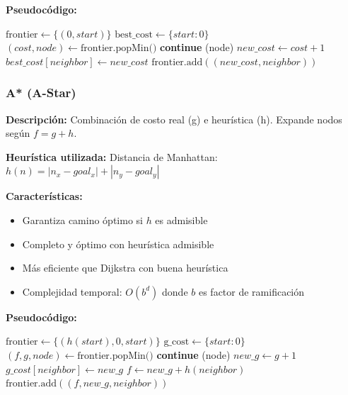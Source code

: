 \documentclass[12pt,a4paper]{article}
\begin{document}
\textbf{Pseudocódigo:}
\begin{algorithm}[H]
\caption{UCS (Dijkstra)}
\begin{algorithmic}
\State $\text{frontier} \gets \{(0, start)\}$
\State $\text{best\_cost} \gets \{start: 0\}$
    \State $(cost, node) \gets \text{frontier.popMin()}$
        \State \textbf{continue}
    \EndIf
        \Return {}(node)
    \EndIf
        \State $new\_cost \gets cost + 1$
            \State $best\_cost[neighbor] \gets new\_cost$
            \State $\text{frontier.add}((new\_cost, neighbor))$
        \EndIf
    \EndFor
\EndWhile
\end{algorithmic}
\end{algorithm}

\subsubsection{A* (A-Star)}

\textbf{Descripción:} Combinación de costo real (g) e heurística (h). Expande nodos según $f = g + h$.

\textbf{Heurística utilizada:} Distancia de Manhattan: $h(n) = |n_x - goal_x| + |n_y - goal_y|$

\textbf{Características:}
\begin{itemize}
    \item Garantiza camino óptimo si $h$ es admisible
    \item Completo y óptimo con heurística admisible
    \item Más eficiente que Dijkstra con buena heurística
    \item Complejidad temporal: $O(b^d)$ donde $b$ es factor de ramificación
\end{itemize}

\textbf{Pseudocódigo:}
\begin{algorithm}[H]
\caption{A* Search}
\begin{algorithmic}
\State $\text{frontier} \gets \{(h(start), 0, start)\}$
\State $\text{g\_cost} \gets \{start: 0\}$
    \State $(f, g, node) \gets \text{frontier.popMin()}$
        \State \textbf{continue}
    \EndIf
        \Return {}(node)
    \EndIf
        \State $new\_g \gets g + 1$
            \State $g\_cost[neighbor] \gets new\_g$
            \State $f \gets new\_g + h(neighbor)$
            \State $\text{frontier.add}((f, new\_g, neighbor))$
        \EndIf
    \EndFor
\EndWhile
\end{algorithmic}
\end{algorithm}
\end{document}
